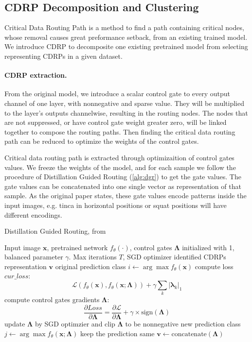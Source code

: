 \documentclass[sigplan,10pt,review]{acmart}\settopmatter{printfolios=true,printccs=false,printacmref=false}
\begin{document}
\subsection{CDRP Decomposition and Clustering}
Critical Data Routing Path is a method to find a path containing critical nodes, whose removal causes great preformance setback, from an existing trained model. We introduce CDRP to decomposite one existing pretrained model from selecting representing CDRPs in a given dataset.

\paragraph{CDRP extraction.}

From the original model, we introduce a scalar control gate to every output channel of one layer, with nonnegative and sparse value. They will be multiplied to the layer's outputs channelwise, resulting in the routing nodes. The nodes that are not suppressed, or have control gate weight greater zero, will be linked together to compose the routing paths. Then finding the critical data routing path can be reduced to optimize the weights of the control gates.

Critical data routing path is extracted through optimizaition of control gates values. We freeze the weights of the model, and for each sample we follow the procedure of Distillation Guided Routing (\cref{alg:dgr}) \cite{wang2018interpret} to get the gate values. The gate values can be concatenated into one single vector as representation of that sample. As the original paper \cite{wang2018interpret} states, these gate values encode patterns inside the input images, e.g. tinca in horizontal positions or squat positions will have different encodings.

\begin{algorithm}
	\caption{Distillation Guided Routing, from \cite{wang2018interpret}}
	\label{alg:dgr}
	\begin{algorithmic}[1]
		\Require Input image $\boldsymbol{x}$, pretrained network $f_\theta(\cdot)$, control gates $\boldsymbol{\Lambda}$ initialized with 1, balanced parameter $\gamma$. Max iterations $T$, SGD optimizer
		\Ensure identified CDRPs representation $\boldsymbol{v}$
		\State original prediction class $i \gets \arg\max f_\theta(\boldsymbol{x})$
			\State compute loss $cur\_loss$: $$\mathcal{L}\left(f_\theta(\boldsymbol{x}), f_\theta(\boldsymbol{x}; \boldsymbol{\Lambda})\right) + \gamma \sum_k |\boldsymbol{\lambda}_k|_1$$
			\State compute control gates gradients $\boldsymbol{\Lambda}$: $$\frac{\partial Loss}{\partial \boldsymbol{\Lambda}} = \frac{\partial \mathcal{L}}{\partial \boldsymbol{\Lambda}} + \gamma \times \mathrm{sign}(\boldsymbol{\Lambda})$$
			\State update $\boldsymbol{\Lambda}$ by SGD optimzier and clip $\boldsymbol{\Lambda}$ to be nonnegative
			\State new prediction class $j \gets \arg\max f_\theta(\boldsymbol{x};\boldsymbol{\Lambda})$
			 \Comment keep the prediction same
					\State $\boldsymbol{v} \gets \mathrm{concatenate}(\boldsymbol{\Lambda})$
				\EndIf
			\EndIf
		\EndFor		
	\end{algorithmic}
\end{algorithm}
\end{document}
